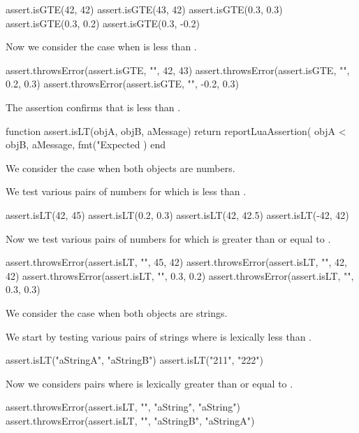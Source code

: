 \startLuaTest
  assert.isGTE(42, 42)
  assert.isGTE(43, 42)
  assert.isGTE(0.3, 0.3)
  assert.isGTE(0.3, 0.2)
  assert.isGTE(0.3, -0.2)
\stopLuaTest

Now we consider the case when  is less than . 

\startLuaTest
  assert.throwsError(assert.isGTE, "", 42, 43)
  assert.throwsError(assert.isGTE, "", 0.2, 0.3)
  assert.throwsError(assert.isGTE, "", -0.2, 0.3)
\stopLuaTest
\stopTestCase

\stopTestSuite


The  assertion confirms that  is less than 
. 

\startLuaCode
function assert.isLT(objA, objB, aMessage)
  return reportLuaAssertion(
    objA < objB,
    aMessage,
    fmt("Expected %
  )
end
\stopLuaCode


We consider the case when both objects are numbers.

We test various pairs of numbers for which  is less than 
. 

\startLuaTest
  assert.isLT(42, 45)
  assert.isLT(0.2, 0.3)
  assert.isLT(42, 42.5)
  assert.isLT(-42, 42)
\stopLuaTest

Now we test various pairs of numbers for which  is greater than 
or equal to . 

\startLuaTest
  assert.throwsError(assert.isLT, "", 45, 42)
  assert.throwsError(assert.isLT, "", 42, 42)
  assert.throwsError(assert.isLT, "", 0.3, 0.2)
  assert.throwsError(assert.isLT, "", 0.3, 0.3)
\stopLuaTest
\stopTestCase


We consider the case when both objects are strings. 

We start by testing various pairs of strings where  is 
lexically less than . 

\startLuaTest
  assert.isLT("aStringA", "aStringB")
  assert.isLT("211", "222")
\stopLuaTest

Now we considers pairs where  is lexically greater than or 
equal to . 

\startLuaTest
  assert.throwsError(assert.isLT, "", "aString", "aString")
  assert.throwsError(assert.isLT, "", "aStringB", "aStringA")
\stopLuaTest
\stopTestCase

